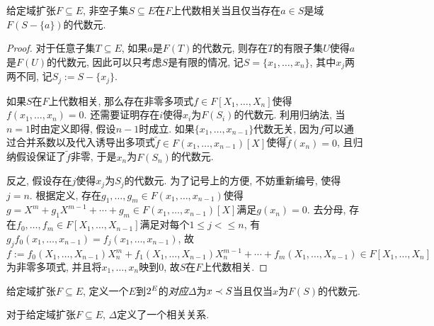 \begin{proposition}\label{prop:algbdependcrit}
    给定域扩张$F\subseteq E$, 非空子集$S\subseteq E$在$F$上代数相关当且仅当存在$a\in S$是域$F(S-\{a\})$的代数元.
\end{proposition}

\begin{proof}
    对于任意子集$T\subseteq E$, 如果$a$是$F(T)$的代数元, 则存在$T$的有限子集$U$使得$a$是$F(U)$的代数元, 因此可以只考虑$S$是有限的情况, 记$S=\{x_1, \dotsc, x_n\}$, 其中$x_j$两两不同, 记$S_j:=S-\{x_j\}$.

    如果$S$在$F$上代数相关, 那么存在非零多项式$f\in F[X_1, \dotsc, X_n]$使得$f(x_1, \dotsc, x_n)=0$. 还需要证明存在$i$使得$x_i$为$F(S_i)$的代数元. 利用归纳法, 当$n=1$时由定义即得, 假设$n-1$时成立. 如果$\{x_1, \dotsc, x_{n-1}\}$代数无关, 因为$f$可以通过合并系数以及代入诱导出多项式$\tilde{f}\in F(x_1, \dotsc, x_{n-1})[X]$使得$\tilde{f}(x_n)=0$, 且归纳假设保证了$\tilde{f}$非零, 于是$x_n$为$F(S_n)$的代数元.

    反之, 假设存在$j$使得$x_j$为$S_j$的代数元. 为了记号上的方便, 不妨重新编号, 使得$j=n$. 根据定义, 存在$g_1, \dotsc, g_m\in F(x_1, \dotsc, x_{n-1})$使得$g=X^m+g_1X^{m-1}+\dotsb+g_m\in F(x_1, \dotsc, x_{n-1})[X]$满足$g(x_n)=0$. 去分母, 存在$f_0, \dotsc, f_m\in F[X_1, \dotsc, X_{n-1}]$满足对每个$1\leq j<\leq n$, 有$g_jf_0(x_1, \dotsc, x_{n-1})=f_j(x_1, \dotsc, x_{n-1})$, 故$f:=f_0(X_1, \dotsc, X_{n-1})X_n^m+f_1(X_1, \dotsc, X_{n-1})X_n^{m-1}+\dotsb+f_m(X_1, \dotsc, X_{n-1})\in F[X_1, \dotsc, X_n]$为非零多项式, 并且将$x_1, \dotsc, x_n$映到0, 故$S$在$F$上代数相关.
\end{proof}

给定域扩张$F\subseteq E$, 定义一个$E$到$2^{E}$的\emph{对应}$\Delta$为$x\prec S$当且仅当$x$为$F(S)$的代数元.
\begin{proposition}\label{prop:algbdependcorr}
    对于给定域扩张$F\subseteq E$, $\Delta$定义了一个相关关系.
\end{proposition}

